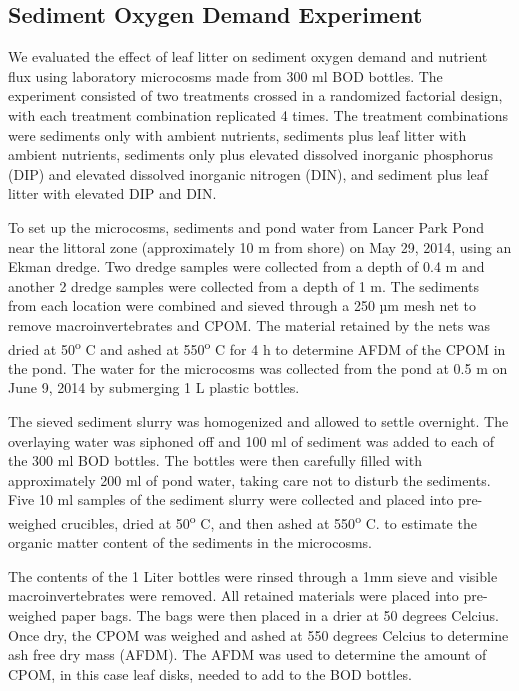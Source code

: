 \subsection{Sediment Oxygen Demand Experiment}
We evaluated the effect of leaf litter on sediment oxygen demand and nutrient flux using laboratory microcosms made from 300 ml BOD bottles. The experiment consisted of two treatments crossed in a randomized factorial design, with each treatment combination replicated 4 times. The treatment combinations were sediments only with ambient nutrients, sediments plus leaf litter with ambient nutrients, sediments only plus elevated dissolved inorganic phosphorus (DIP) and elevated dissolved inorganic nitrogen (DIN), and sediment plus leaf litter with elevated DIP and DIN. 

To set up the microcosms, sediments and pond water from Lancer Park Pond near the littoral zone (approximately 10 m from shore) on May 29, 2014, using an Ekman dredge.  Two dredge samples were collected from a depth of 0.4 m and another 2 dredge samples were collected from a depth of 1 m. The sediments from each location were combined and sieved through a 250 µm mesh net to remove macroinvertebrates and CPOM. The material retained by the nets was dried at 50\textsuperscript{o} C and ashed at 550\textsuperscript{o} C for 4 h to determine AFDM of the CPOM in the pond. The water for the microcosms was  collected from the pond at 0.5 m on June 9, 2014 by submerging 1 L plastic bottles.

The sieved sediment slurry was homogenized and allowed to settle overnight. The overlaying water was siphoned off and 100 ml of sediment was added to each of the 300 ml BOD bottles. The bottles were then carefully filled with approximately 200 ml of pond water, taking care not to disturb the sediments. Five 10 ml samples of the sediment slurry were collected and placed into pre-weighed crucibles, dried at 50\textsuperscript{o} C, and then ashed at 550\textsuperscript{o} C. to estimate the organic matter content of the sediments in the microcosms.

The contents of the 1 Liter bottles were rinsed through a 1mm sieve and visible macroinvertebrates were removed. All retained materials were placed into pre-weighed paper bags. The bags were then placed in a drier at 50 degrees Celcius. Once dry, the CPOM was weighed and ashed at 550 degrees Celcius to determine ash free dry mass (AFDM). The AFDM was used to determine the amount of CPOM, in this case leaf disks, needed to add to the BOD bottles.

